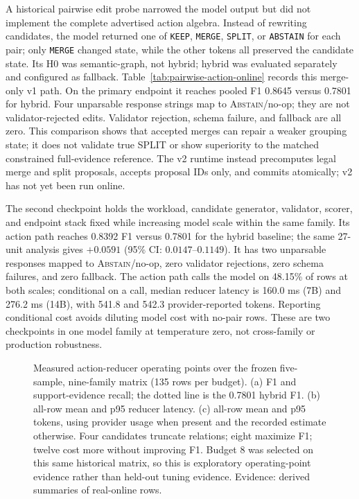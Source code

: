 \documentclass[sigplan,anonymous,nonacm]{acmart}
\begin{document}
A historical pairwise edit probe narrowed the model output but did not implement the complete advertised action algebra. Instead of rewriting candidates, the model returned one of \texttt{KEEP}, \texttt{MERGE}, \texttt{SPLIT}, or \texttt{ABSTAIN} for each pair; only \texttt{MERGE} changed state, while the other tokens all preserved the candidate state. Its H0 was semantic-graph, not hybrid; hybrid was evaluated separately and configured as fallback. Table~\ref{tab:pairwise-action-online} records this merge-only v1 path. On the primary endpoint it reaches pooled F1 0.8645 versus 0.7801 for hybrid. Four unparsable response strings map to \textsc{Abstain}/no-op; they are not validator-rejected edits. Validator rejection, schema failure, and fallback are all zero. This comparison shows that accepted merges can repair a weaker grouping state; it does not validate true SPLIT or show superiority to the matched constrained full-evidence reference. The v2 runtime instead precomputes legal merge and split proposals, accepts proposal IDs only, and commits atomically; v2 has not yet been run online.

The second checkpoint holds the workload, candidate generator, validator, scorer, and endpoint stack fixed while increasing model scale within the same family. Its action path reaches 0.8392 F1 versus 0.7801 for the hybrid baseline; the same 27-unit analysis gives $+0.0591$ (95\% CI: $0.0147$--$0.1149$). It has two unparsable responses mapped to \textsc{Abstain}/no-op, zero validator rejections, zero schema failures, and zero fallback. The action path calls the model on 48.15\% of rows at both scales; conditional on a call, median reducer latency is 160.0 ms (7B) and 276.2 ms (14B), with 541.8 and 542.3 provider-reported tokens. Reporting conditional cost avoids diluting model cost with no-pair rows. These are two checkpoints in one model family at temperature zero, not cross-family or production robustness.

\begin{figure}[t]
\centering

\caption{Measured action-reducer operating points over the frozen five-sample, nine-family matrix (135 rows per budget). (a) F1 and support-evidence recall; the dotted line is the 0.7801 hybrid F1. (b) all-row mean and p95 reducer latency. (c) all-row mean and p95 tokens, using provider usage when present and the recorded estimate otherwise. Four candidates truncate relations; eight maximize F1; twelve cost more without improving F1. Budget 8 was selected on this same historical matrix, so this is exploratory operating-point evidence rather than held-out tuning evidence. Evidence: derived summaries of real-online rows.}
\label{fig:quality-cost}
\end{figure}
\end{document}
